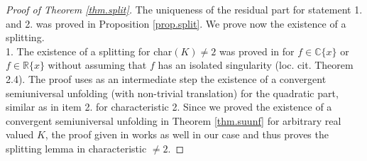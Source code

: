\documentclass[11pt]{article}
\newcommand{\R}{{\mathbb R}}
\newcommand{\C}{{\mathbb C}}
\begin{document}
\begin{proof}[Proof of Theorem \ref{thm.split}] 
The uniqueness of the residual  part for statement 1. and 2. was proved in Proposition \ref{prop.split}. We prove now the existence of a splitting.\\
1. The existence of a splitting for char$(K) \ne2$ was proved in \cite[Theorem 2.1]{GP25} for  $f\in \C\{x\}$ or  $f\in \R\{x\}$  without assuming that $f$ has an isolated singularity (loc. cit. Theorem 2.4). The proof uses as an intermediate step the existence of a convergent semiuniversal unfolding (with non-trivial translation) for the quadratic part, similar as in item 2. for characteristic 2.
Since we proved the existence of a convergent semiuniversal unfolding in Theorem \ref{thm.suunf} for arbitrary real valued $K$, the proof given in \cite[Theorem 2.4]{GP25} works as well in our case and thus proves the splitting lemma in characteristic $\ne 2$.


\end{proof}
\end{document}

